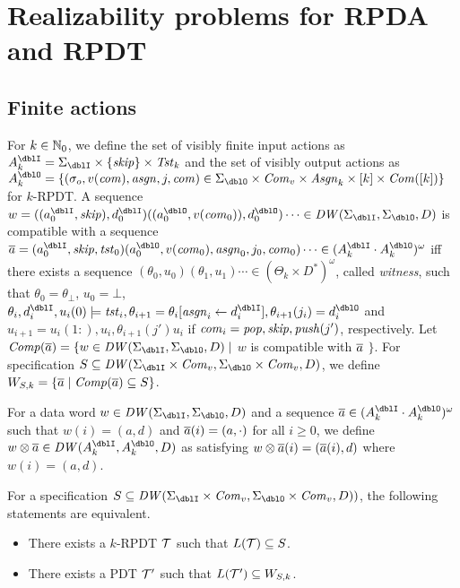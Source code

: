\section{Realizability problems for RPDA and RPDT}
\subsection{Finite actions}
For $k\in\mathbb{N}_0$,
we define the set of visibly finite input actions as $A_k^\dblI = \Sigma_\dblI\times\{\skip\}\times \Tst_k$
and the set of visibly output actions as $A_k^\dblO = \{(\sigma_o, v(\com), \asgn, j, \com)\in \Sigma_\dblO\times\Com_v\times \Asgn_k\times [k]\times \Com([k])\}$ for $k$-RPDT.
A sequence $w = ((a^\dblI_0, \skip),d^\dblI_0) ((a^\dblO_0,v(\com_0)),d^\dblO_0)\cdots \in \DW(\Sigma_\dblI,\Sigma_\dblO,D)$ is compatible with a sequence
$\overa = (a^\dblI_0, \skip,\tst_0)(a^\dblO_0,v(\com_0),\asgn_0,j_0, \com_0)\cdots \in (A_k^\dblI\cdot A_k^\dblO)^\omega$
iff there exists a sequence $(\theta_0,u_0)(\theta_1, u_1)\cdots\in (\Theta_k\times D^*)^\omega$, called \emph{witness}, such that
$\theta_0 = \theta_\bot$, $u_0 = \bot$,
$\theta_i, d^\dblI_i, u_i(0) \models \tst_i, \theta_{i+1}=\theta_i[\asgn_i\leftarrow d^\dblI_i], \theta_{i+1}(j_i) = d^\dblO_i$ and $u_{i+1}={u_i(1:)}, u_i, \theta_{i+1}(j')u_i$
if $\mathit{com}_i=\mathit{pop},\mathit{skip},\mathit{push}(j')$, respectively.
Let $\Comp(\overa) = \{w\in \DW(\Sigma_\dblI,\Sigma_\dblO,D)\mid$ $w$ is compatible with ${\overline{a}}$ $\}$.
For specification $S \subseteq \DW(\Sigma_\dblI\times\Com_v,\Sigma_\dblO\times\Com_v,D)$, we define $W_{S,k}=\{{\overline{a}}\mid {\mathit{Comp}}({\overline{a}})\subseteq S\}$.

For a data word $w\in\DW(\Sigma_\dblI,\Sigma_\dblO,D)$ and
a sequence $\overa\in(A_k^\dblI\cdot A_k^\dblO)^\omega$
such that $w(i)=(a,d)$ and ${\overline{a}}(i)=(a,\cdot)$ for all $i\geq 0$,
we define $w\otimes\overa\in\DW(A_k^\dblI,A_k^\dblO,D)$ as satisfying
$w\otimes{\overline{a}}(i)=({\overline{a}}(i), d)$ where $w(i)=(a,d)$.

\begin{theorem}\label{the: finite_actions}
For a specification $S\subseteq \DW(\Sigma_\dblI\times\Com_v,\Sigma_\dblO\times\Com_v,D))$, the following statements are equivalent.
\begin{itemize}
\item There exists a $k$-RPDT ${\cal T}$ such that $L({\cal T})\subseteq S$.
\item There exists a PDT ${\cal T}'$ such that $L({\cal T}')\subseteq W_{S,k}$.
\end{itemize}
\end{theorem}

